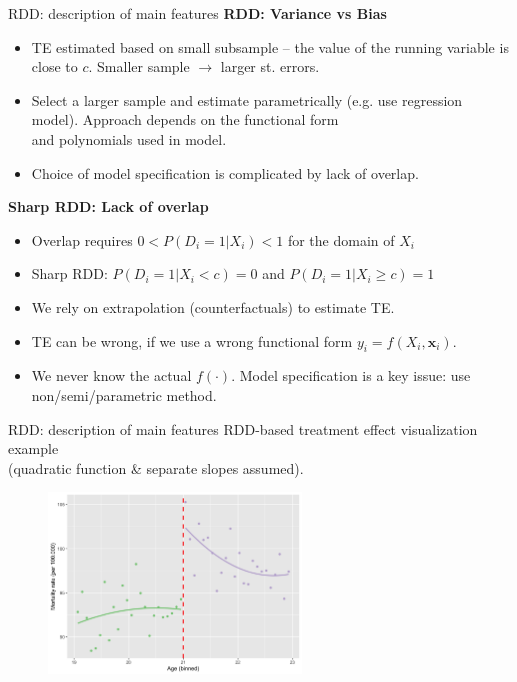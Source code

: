 \documentclass{beamer}
\begin{document}
\begin{frame}{RDD: description of main features}
\textbf{RDD: Variance vs Bias}
\begin{itemize}
    \item TE estimated based on small subsample -- the value of the running variable is close to $c$. Smaller sample $\rightarrow$ larger st. errors.
    \item Select a larger sample and estimate parametrically (e.g. use regression model). Approach depends on  the functional form \\and polynomials used in model. 
    \item Choice of model specification is complicated by lack of overlap.
\end{itemize}
\bigskip
\textbf{Sharp RDD: Lack of overlap}
\begin{itemize}
    \item Overlap requires $0 < P(D_i = 1|X_i ) < 1$ for the domain of $X_i$
    \item Sharp RDD: $P(D_i = 1|X_i < c) = 0$ and $P(D_i = 1|X_i \geq c) = 1$
    \item We rely on extrapolation (counterfactuals) to estimate TE.
    \item TE can be wrong, if we use a wrong functional form $y_i = f(X_i,\bm{x}_i )$.
    \item We never know the actual $f(\cdot)$. Model specification is a key issue: use non/semi/parametric method.
\end{itemize}
\end{frame}
\begin{frame}{RDD: description of main features}
\centering
RDD-based treatment effect visualization example\\
(quadratic function \& separate slopes assumed).\\ \medskip
\begin{figure}
    \includegraphics[trim = 0cm 0cm 0cm 0cm, clip, width=0.6\textwidth]{./IMG/RDD2.png}
\end{figure}    
\end{frame}
\end{document}
